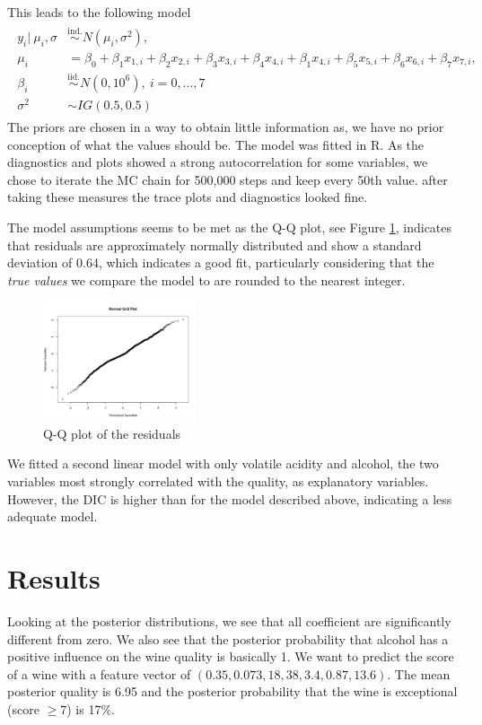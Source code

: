 \documentclass[a4paper,11pt]{article}
\begin{document}
This leads to the following model
\begin{align}
\begin{split}
y_i |\ \mu_i, \sigma &\stackrel{\text{ind.}}{\sim} N(\mu_i, \sigma^2),\\
\mu_i &= \beta_0 + \beta_1x_{1,i} + \beta_2x_{2,i} + \beta_3x_{3,i}  + \beta_4x_{4,i}  + \beta_1x_{4,i}  + \beta_5x_{5,i}  + \beta_6x_{6,i} + \beta_7x_{7,i},\\
\beta_i &\stackrel{\text{iid.}}{\sim} N(0, 10^6), \ i =0,\dots, 7 \\
\sigma^2 & \sim IG(0.5, 0.5)
\end{split}
\end{align}
The priors are chosen in a way to obtain little information as, we have no prior conception of what the values should be.
The model was fitted in R. As the diagnostics and plots showed a strong autocorrelation for some variables, we chose to iterate the MC chain for 500,000 steps and keep every 50th value. after taking these measures the trace plots and diagnostics looked fine.

The model assumptions seems to be met as the Q-Q plot, see Figure \ref{fig:qq}, indicates that residuals are approximately normally distributed and show a standard deviation of 0.64, which indicates a good fit, particularly considering that the \emph{true values} we compare the model to are rounded to the nearest integer.

\begin{figure}[H]
\centering
	\includegraphics[width=0.4\textwidth]{qqplot.jpeg}
	\caption{Q-Q plot of the residuals}
	\label{fig:qq}
\end{figure}

We fitted a second linear model with only volatile acidity and alcohol, the two variables most strongly correlated with the quality, as explanatory variables. However, the DIC is higher than for the model described above, indicating a less adequate model.

\section{Results}
Looking at the posterior distributions, we see that all coefficient are significantly different from zero. We also see that the posterior probability that alcohol has a positive influence on the wine quality is basically 1.
We want to predict the score of a wine with a feature vector of $(0.35, 0.073, 18, 38, 3.4, 0.87, 13.6)$. The mean posterior quality is 6.95 and the posterior probability that the wine is exceptional (score $\geq 7$) is 17\%. 
\end{document}
